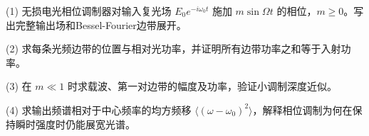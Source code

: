(1) 无损电光相位调制器对输入复光场 \(E_0e^{-i\omega_0t}\) 施加 \(m\sin\Omega t\) 的相位，\(m\ge0\)。写出完整输出场和Bessel-Fourier边带展开。

(2) 求每条光频边带的位置与相对光功率，并证明所有边带功率之和等于入射功率。

(3) 在 \(m\ll1\) 时求载波、第一对边带的幅度及功率，验证小调制深度近似。

(4) 求输出频谱相对于中心频率的均方频移 \(\langle(\omega-\omega_0)^2\rangle\)，解释相位调制为何在保持瞬时强度时仍能展宽光谱。
